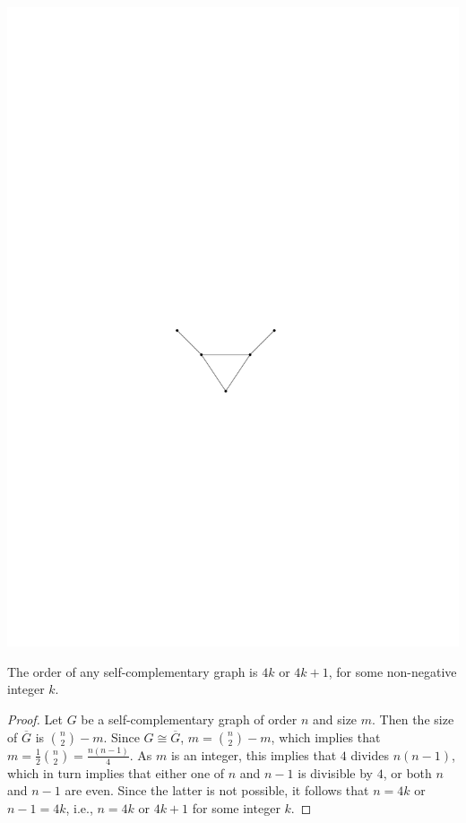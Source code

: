 \begin{center}
\includegraphics{Images/BullGraph.pdf}
\end{center}

\begin{Theorem}\label{thm:SCOrder}
The order of any self-complementary graph is $4k$ or $4k + 1$, for some non-negative integer $k$.
\end{Theorem}

\begin{proof}
Let $G$ be a self-complementary graph of order $n$ and size $m$. Then the size of $\overline G$ is $\binom n 2 - m$. Since $G \cong \overline G$, $m = \binom n 2 - m$, which implies that $m = \frac 1 2 \binom n 2 = \frac {n(n - 1)}{4}$. As $m$ is an integer, this implies that $4$ divides $n(n - 1)$, which in turn implies that either one of $n$ and $n - 1$ is divisible by $4$, or both $n$ and $n - 1$ are even. Since the latter is not possible, it follows that $n = 4k$ or $n - 1 = 4k$, i.e., $n = 4k$ or $4k + 1$ for some integer $k$.
\end{proof}


